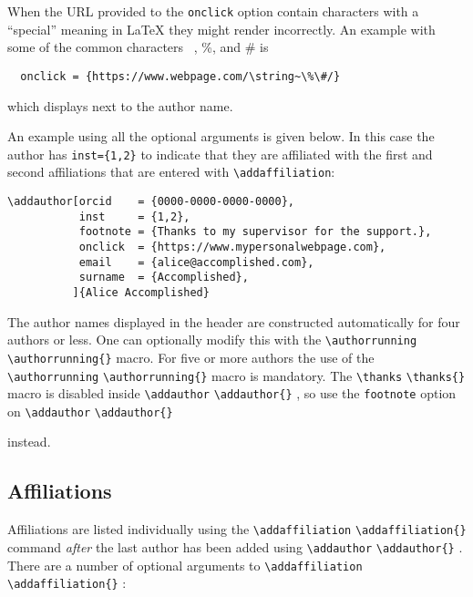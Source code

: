 \documentclass{iacrcc}
\newcommand{\cmd}[2][]{%
  \def\FirstArg{#1}
  \ifx\FirstArg\empty
    \texttt{\textbackslash{}#2}%
  \else
    \texttt{\textbackslash{}#2\{#1\}}%
  \fi
}
\begin{document}
When the URL provided to the {\tt onclick} option contain characters
with a ``special'' meaning in \LaTeX{} they might render incorrectly.
An example with some of the common characters \string~, \%, and \# is
\begin{verbatim}
  onclick = {https://www.webpage.com/\string~\%\#/}
\end{verbatim}
\noindent which displays 
next to the author name.

An example using all the optional arguments is given below. In this case
the author has \verb+inst={1,2}+ to indicate that they are affiliated with
the first and second affiliations that are entered with
\verb+\addaffiliation+:

\begin{verbatim}
\addauthor[orcid    = {0000-0000-0000-0000},
           inst     = {1,2},
           footnote = {Thanks to my supervisor for the support.},
           onclick  = {https://www.mypersonalwebpage.com},
           email    = {alice@accomplished.com},
           surname  = {Accomplished},
          ]{Alice Accomplished}
\end{verbatim}

The author names displayed in the header are constructed automatically
for four authors or less. One can optionally modify this with the
\cmd{authorrunning} macro.  For five or more authors the use of the
\cmd{authorrunning} macro is mandatory. The \cmd{thanks} macro is disabled
inside \cmd{addauthor}, so use the \verb+footnote+ option on \cmd{addauthor}
instead.

\subsection{Affiliations}
Affiliations are listed individually using the \cmd{addaffiliation} command
\emph{after} the last author has been added using \cmd{addauthor}.
There are a number of optional arguments to \cmd{addaffiliation}:
\end{document}
